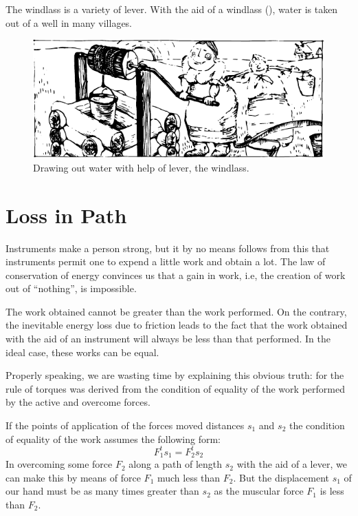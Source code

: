 The windlass is a variety of lever. With the aid of a windlass (), water is taken out of a well in many villages.

 \begin{figure}[!ht]
 \centering
 \includegraphics[width=\textwidth]{figures/fig-5-04.pdf}
 \caption{Drawing out water with help of lever, the windlass.}
 \label{fig-5-04}
 \end{figure}

\section{Loss in Path}
Instruments make a person strong, but it by no means
follows from this that instruments permit one to expend
a little work and obtain a lot. The law of conservation of
energy convinces us that a gain in work, i.e, the creation
of work out of ``nothing'', is impossible.

The work obtained cannot be greater than the work
performed. On the contrary, the inevitable energy loss
due to friction leads to the fact that the work obtained
with the aid of an instrument will always be less than that
performed. In the ideal case, these works can be equal.

Properly speaking, we are wasting time by explaining
this obvious truth: for the rule of torques was derived from
the condition of equality of the work performed by the
active and overcome forces.

If the points of application of the forces moved distances
$s_{1}$ and $s_{2}$ the condition of equality of the work assumes
the following form:
\begin{equation*}%
F_{1}^{t}s_{1} = F_{2}^{t}s_{2}
 \end{equation*}
In overcoming some force $F_{2}$ along a path of length $s_{2}$
with the aid of a lever, we can make this by means of
force $F_{1}$ much less than $F_{2}$. But the displacement $s_{1}$ of
our hand must be as many times greater than $s_{2}$ as the muscular force $F_{1}$ is less than $F_{2}$.

